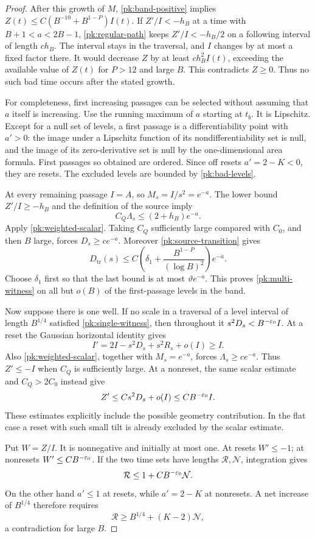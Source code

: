 \begin{proof}
After this growth of $M$, \eqref{pk:band-positive} implies
$Z(t)\le C(B^{-10}+B^{1-P})I(t)$.  If $Z'/I<-h_B$ at a time
with $B+1<a<2B-1$, \eqref{pk:regular-path} keeps
$Z'/I<-h_B/2$ on a following interval of length $c h_B$.
The interval stays in the traversal, and $I$ changes by at most a
fixed factor there.  It would decrease $Z$ by at least
$c h_B^2 I(t)$, exceeding the available value of $Z(t)$ for
$P>12$ and large $B$.  This contradicts $Z\ge0$.  Thus no such
bad time occurs after the stated growth.

For completeness, first increasing passages can be selected without
assuming that $a$ itself is increasing.  Use the running maximum of
$a$ starting at $t_b$.  It is Lipschitz.  Except for a null set of
levels, a first passage is a differentiability point with $a'>0$:
the image under a Lipschitz function of its nondifferentiability
set is null, and the image of its zero-derivative set is null by
the one-dimensional area formula.  First passages so obtained
are ordered.  Since off resets $a'=2-K<0$, they are resets.
The excluded levels are bounded by \eqref{pk:bad-levels}.

At every remaining passage $I=A$, so $M_s=I/s^2=e^{-a}$.
The lower bound $Z'/I\ge-h_B$ and the definition of the source
imply
\[
 C_Q\Lambda_s\le(2+h_B)e^{-a}.
\]
Apply \eqref{pk:weighted-scalar}.  Taking $C_Q$ sufficiently
large compared with $C_0$, and then $B$ large, forces
$D_s\ge c e^{-a}$.  Moreover \eqref{pk:source-transition} gives
\[
 D_{\mathrm{tr}}(s)
 \le C\left(\delta_1+\frac{B^{1-P}}{(\log B)^2}\right)e^{-a}.
\]
Choose $\delta_1$ first so that the last bound is at most
$\vartheta e^{-a}$.  This proves \eqref{pk:multi-witness} on
all but $o(B)$ of the first-passage levels in the band.

Now suppose there is one well.  If no scale in a traversal of a
level interval of length $B^{1/4}$ satisfied
\eqref{pk:single-witness}, then throughout it
$s^2D_s<B^{-\varepsilon_0}I$.  At a reset the Gaussian horizontal
identity gives
\[
 I'=2I-s^2D_s+s^2R_s+o(I)\ge I.
\]
Also \eqref{pk:weighted-scalar}, together with $M_s=e^{-a}$,
forces $\Lambda_s\ge c e^{-a}$.  Thus $Z'\le-I$ when $C_Q$
is sufficiently large.  At a nonreset, the same scalar estimate
and $C_Q>2C_0$ instead give
\[
 Z'\le C s^2D_s+o(I)\le C B^{-\varepsilon_0}I.
\]
These estimates explicitly include the possible geometry
contribution.  In the flat case a reset with such small tilt is
already excluded by the scalar estimate.

Put $W=Z/I$.  It is nonnegative and initially at most one.  At
resets $W'\le-1$; at nonresets $W'\le C B^{-\varepsilon_0}$.
If the two time sets have lengths $\mathcal R,\mathcal N$,
integration gives
\[
 \mathcal R\le1+C B^{-\varepsilon_0}\mathcal N.
\]
On the other hand $a'\le1$ at resets, while $a'=2-K$ at
nonresets.  A net increase of $B^{1/4}$ therefore requires
\[
 \mathcal R\ge B^{1/4}+(K-2)\mathcal N,
\]
a contradiction for large $B$.


\end{proof}
